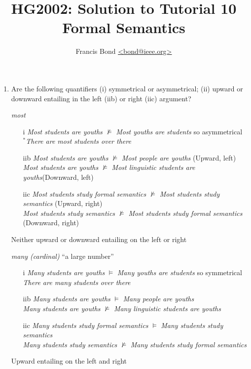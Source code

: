 \documentclass[a4paper]{article}
\title{HG2002: Solution to Tutorial 10\\  Formal Semantics}
\author{Francis Bond \url{<bond@ieee.org>}}
\date{}%
\newcommand{\com}[1]{\hfill (#1)}
\begin{document}
\maketitle

\begin{enumerate}
\item Are the following quantifiers (i) symmetrical or asymmetrical;
  (ii) upward or downward entailing in the left (iib) or right (iic)
  argument?
  \begin{exe}
    \ex \textit{most}
    \begin{itemize}
    \item[i] \textit{Most students are youths} $\not\models$
      \textit{Most youths are students} so asymmetrical
      \\ $^*$\textit{There are most students over there}
    \item[iib] \textit{Most students are youths}  $\not\models$
      \textit{Most people are youths} \com{Upward, left}
     \\  \textit{Most students are youths}  $\not\models$
     \textit{Most linguistic students are youths}\com{Downward, left}
       \item[iic]  \textit{Most students study formal semantics}  $\not\models$
     \textit{Most students study semantics} \com{Upward, right}
     \\ \textit{Most students study semantics}  $\not\models$
      \textit{Most students study formal semantics} \com{Downward, right}
    \end{itemize}
      Neither upward or downward entailing on the left or right

    \ex \textit{many (cardinal)} ``a large number''
      \begin{itemize}
    \item[i] \textit{Many students are youths} $\models$
      \textit{Many youths are students} so symmetrical
      \\ \textit{There are many students over there}
    \item[iib] \textit{Many students are youths}  $\models$
      \textit{Many people are youths}
     \\  \textit{Many students are youths}  $\not\models$
     \textit{Many linguistic students are youths}
       \item[iic] \textit{Many students study formal semantics}  $\models$
      \textit{Many students study semantics} 
     \\  \textit{Many students study semantics}  $\not\models$
      \textit{Many students study formal semantics}
    \end{itemize}
     Upward entailing on the left and right


\end{exe}
\end{enumerate}
\end{document}
